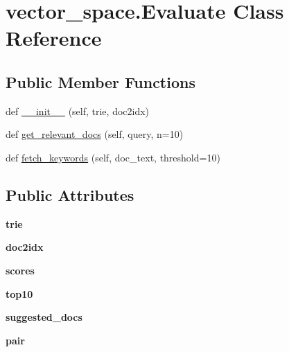 \hypertarget{classvector__space_1_1_evaluate}{}\section{vector\+\_\+space.\+Evaluate Class Reference}
\label{classvector__space_1_1_evaluate}
\subsection*{Public Member Functions}
\begin{DoxyCompactItemize}
\item 
def \hyperlink{classvector__space_1_1_evaluate_a0e393062023dc2594bf9c76854f08185}{\+\_\+\+\_\+init\+\_\+\+\_\+} (self, trie, doc2idx)
\item 
def \hyperlink{classvector__space_1_1_evaluate_aafcdd9a278f5cb4305d53b1c977c372d}{get\+\_\+relevant\+\_\+docs} (self, query, n=10)
\item 
def \hyperlink{classvector__space_1_1_evaluate_ac561d193195b176f1661334c8c42336b}{fetch\+\_\+keywords} (self, doc\+\_\+text, threshold=10)
\end{DoxyCompactItemize}
\subsection*{Public Attributes}
\begin{DoxyCompactItemize}
\item 
{\bfseries trie}\hypertarget{classvector__space_1_1_evaluate_a39fea1c78318d69c46a8aa6a402833bb}{}\label{classvector__space_1_1_evaluate_a39fea1c78318d69c46a8aa6a402833bb}

\item 
{\bfseries doc2idx}\hypertarget{classvector__space_1_1_evaluate_afc5e4d8c38259c74dafaf897b1b85a8b}{}\label{classvector__space_1_1_evaluate_afc5e4d8c38259c74dafaf897b1b85a8b}

\item 
{\bfseries scores}\hypertarget{classvector__space_1_1_evaluate_af026d7004916dc38c845e4280b24cbd6}{}\label{classvector__space_1_1_evaluate_af026d7004916dc38c845e4280b24cbd6}

\item 
{\bfseries top10}\hypertarget{classvector__space_1_1_evaluate_a8e95a5f443892a2d8887f8ebc90476e3}{}\label{classvector__space_1_1_evaluate_a8e95a5f443892a2d8887f8ebc90476e3}

\item 
{\bfseries suggested\+\_\+docs}\hypertarget{classvector__space_1_1_evaluate_aa0eb502dc1bc16f2c190d744b08cd35c}{}\label{classvector__space_1_1_evaluate_aa0eb502dc1bc16f2c190d744b08cd35c}

\item 
{\bfseries pair}\hypertarget{classvector__space_1_1_evaluate_a758e7d619ba10d43b691c12a43a1a1be}{}\label{classvector__space_1_1_evaluate_a758e7d619ba10d43b691c12a43a1a1be}

\end{DoxyCompactItemize}


